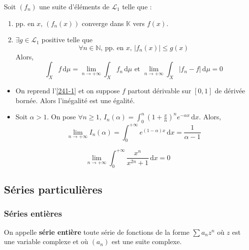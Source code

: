   \begin{theorem}
    Soit $(f_n)$ une suite d'éléments de $\mathcal{L}_1$ telle que :
    \begin{enumerate}[label=(\roman*)]
      \item pp. en $x$, $(f_n(x))$ converge dans $\mathbb{K}$ vers $f(x)$.
      \item $\exists g \in \mathcal{L}_1$ positive telle que
      \[ \forall n \in \mathbb{N}, \, \text{pp. en } x, \, \vert f_n(x) \vert \leq g(x) \]
      Alors,
      \[ \int_X f \, \mathrm{d}\mu = \lim_{n \rightarrow +\infty} \int_X f_n \, \mathrm{d}\mu \text{ et } \lim_{n \rightarrow +\infty} \int_X \vert f_n - f \vert \, \mathrm{d}\mu = 0 \]
    \end{enumerate}
  \end{theorem}

  \begin{example}
    \begin{itemize}
      \item On reprend l'\cref{241-1} et on suppose $f$ partout dérivable sur $[0,1]$ de dérivée bornée. Alors l'inégalité est une égalité.
      \item Soit $\alpha > 1$. On pose $\forall n \geq 1, \, I_n(\alpha) = \int_0^n \left( 1 + \frac{x}{n} \right)^n e^{-\alpha x} \, \mathrm{d}x$. Alors,
      \[ \lim_{n \rightarrow +\infty} I_n(\alpha) = \int_0^{+\infty} e^{(1-\alpha)x} \, \mathrm{d}x = \frac{1}{\alpha - 1} \]
    \end{itemize}
  \end{example}


  \begin{example}
    \[ \lim_{n \rightarrow +\infty} \int_{0}^{+\infty} \frac{x^n}{x^{2n} + 1} \, \mathrm{d}x = 0 \]
  \end{example}

  \subsection{Séries particulières}

  \subsubsection{Séries entières}


  \begin{definition}
    On appelle \textbf{série entière} toute série de fonctions de la forme $\sum a_n z^n$ où $z$ est une variable complexe et où $(a_n)$ est une suite complexe.
  \end{definition}

